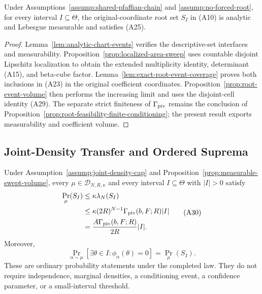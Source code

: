 \begin{proposition}
\label{prop:measurable-swept-volume}
Under Assumptions~\ref{assump:shared-pfaffian-chain} and
\ref{assump:no-forced-root}, for every interval $I\subseteq\Theta$, the
original-coordinate root set $S_I$ in \textup{(A10)} is analytic and
Lebesgue measurable and satisfies \textup{(A25)}.
\end{proposition}

\begin{proof}
Lemma~\ref{lem:analytic-chart-events} verifies the descriptive-set
interfaces and measurability.  Proposition~\ref{prop:localized-area-sweep}
uses countable disjoint Lipschitz localization to obtain the extended
multiplicity identity, determinant \textup{(A15)}, and beta-cube factor.
Lemma~\ref{lem:exact-root-event-coverage} proves both inclusions in
\textup{(A23)} in the original coefficient coordinates.
Proposition~\ref{prop:root-event-volume} then performs the increasing limit
and uses the disjoint-cell identity \textup{(A29)}.  The separate strict
finiteness of $\Gamma_{\rm piv}$ remains the conclusion of
Proposition~\ref{prop:root-feasibility-finite-conditioning}; the present
result exports measurability and coefficient volume.
\end{proof}

\subsection{Joint-Density Transfer and Ordered Suprema}

\begin{proposition}
\label{prop:joint-density-transfer}
Under Assumption~\ref{assump:joint-density-cap} and
Proposition~\ref{prop:measurable-swept-volume}, every
$\mu\in\mathcal D_{N,R,\kappa}$ and every interval $I\subseteq\Theta$ with
$|I|>0$ satisfy
\[
\begin{aligned}
\Pr_\mu(S_I)
&\leq\kappa\lambda_N(S_I)\\
&\leq\kappa(2R)^{N-1}\Gamma_{\rm piv}(b,F;R)|I|\\
&=\frac{A\Gamma_{\rm piv}(b,F;R)}{2R}|I|.
\end{aligned}
\tag{A30}
\]
Moreover,
\[
\Pr_{\alpha\sim\mu}\!\left[\exists\theta\in I:
\phi_\alpha(\theta)=0\right]=\Pr_\mu(S_I).
\tag{A31}
\]
These are ordinary probability statements under the completed law.  They
do not require independence, marginal densities, a conditioning event, a
confidence parameter, or a small-interval threshold.
\end{proposition}

